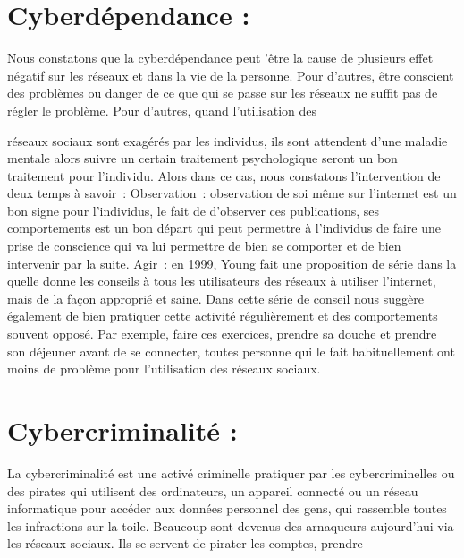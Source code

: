 \documentclass[12pt,a4paper,titlepage]{article}
\begin{document}
\section{Cyberdépendance : }
Nous constatons que la cyberdépendance peut ’être la cause
de plusieurs effet négatif sur les réseaux et dans la vie de la
personne. Pour d’autres, être conscient des problèmes ou
danger de ce que qui se passe sur les réseaux ne suffit pas de
régler le problème. Pour d’autres, quand l’utilisation des

réseaux sociaux sont exagérés par les individus, ils sont
attendent d’une maladie mentale alors suivre un certain
traitement psychologique seront un bon traitement pour
l’individu. Alors dans ce cas, nous constatons l’intervention de
deux temps à savoir :
Observation : observation de soi même sur l’internet est un
bon signe pour l’individus, le fait de d’observer ces
publications, ses comportements est un bon départ qui peut
permettre à l’individus de faire une prise de conscience qui va
lui permettre de bien se comporter et de bien intervenir par
la suite.
Agir : en 1999, Young fait une proposition de série dans la
quelle donne les conseils à tous les utilisateurs des réseaux à
utiliser l’internet, mais de la façon approprié et saine. Dans
cette série de conseil nous suggère également de bien
pratiquer cette activité régulièrement et des comportements
souvent opposé. Par exemple, faire ces exercices, prendre sa
douche et prendre son déjeuner avant de se connecter,
toutes personne qui le fait habituellement ont moins de
problème pour l’utilisation des réseaux sociaux.

\section{Cybercriminalité :}
La cybercriminalité est une activé criminelle pratiquer par les
cybercriminelles ou des pirates qui utilisent des ordinateurs,
un appareil connecté ou un réseau informatique pour
accéder aux données personnel des gens, qui rassemble
toutes les infractions sur la toile.
Beaucoup sont devenus des arnaqueurs aujourd’hui via les
réseaux sociaux. Ils se servent de pirater les comptes, prendre
\end{document}

